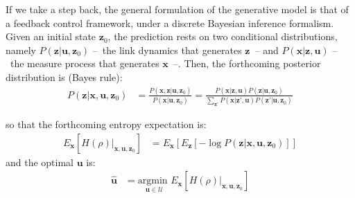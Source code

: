 \documentclass{article} %
\begin{document}
If we take a step back, the general formulation of the generative model is that of a feedback control framework, under a discrete Bayesian inference formalism. %
Given an initial state $\boldsymbol{z}_0$, the prediction rests on two conditional distributions, namely $P(\boldsymbol{z}|\boldsymbol{u},\boldsymbol{z}_0)$ --~the link dynamics that generates $\boldsymbol{z}$~-- and $P(\boldsymbol{x}|\boldsymbol{z},\boldsymbol{u})$ --~the measure process that generates $\boldsymbol{x}$~--. %
Then, the forthcoming posterior distribution is (Bayes rule):
	\begin{align}
	P(\boldsymbol{z}|\boldsymbol{x},\boldsymbol{u},\boldsymbol{z}_0) &= \frac{P(\boldsymbol{x},\boldsymbol{z}|\boldsymbol{u},\boldsymbol{z}_0)}{P(\boldsymbol{x}|\boldsymbol{u},\boldsymbol{z}_0)}
	= \frac{P(\boldsymbol{x}|\boldsymbol{z},\boldsymbol{u}) P(\boldsymbol{z}|\boldsymbol{u},\boldsymbol{z}_0)}{\sum_{\boldsymbol{z}'}P(\boldsymbol{x}|\boldsymbol{z}',\boldsymbol{u}) P(\boldsymbol{z}'|\boldsymbol{u},\boldsymbol{z}_0)}\label{eq:post}
	\end{align}
	
	so that the forthcoming entropy expectation is:
	\begin{align}
	E_{\boldsymbol{x}}\left[H(\rho)|_{\boldsymbol{x}, \boldsymbol{u}, \boldsymbol{z}_0}\right] &=  E_{\boldsymbol{x}}\left[E_{\boldsymbol{z}}\left[-\log  P(\boldsymbol{z}|\boldsymbol{x},\boldsymbol{u},\boldsymbol{z}_0)\right]\right]
	\end{align}
	and the optimal $\boldsymbol{u}$ is:
	\begin{align}
	\hat{\boldsymbol{u}} &= \underset{\boldsymbol{u} \in \mathcal{U}}{\text{argmin }} E_{\boldsymbol{x}}\left[H(\rho)|_{\boldsymbol{x}, \boldsymbol{u}, \boldsymbol{z}_0}\right]
	\end{align}
	
\end{document}
